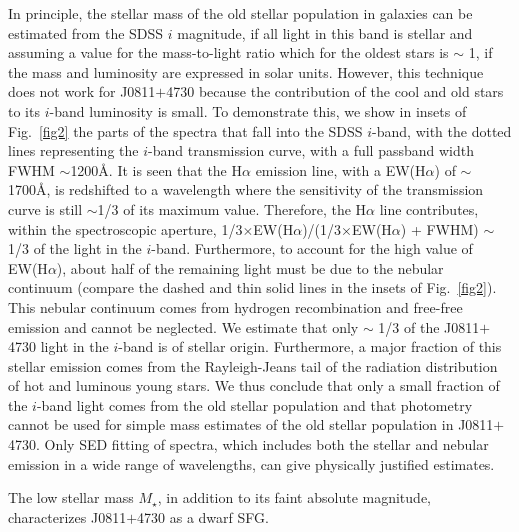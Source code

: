 \documentclass[useAMS,usenatbib]{mn2e}
\begin{document}
In principle, the stellar mass of the old stellar population in galaxies 
can be estimated from the SDSS $i$ magnitude, if all light in this
band is stellar and assuming a value for the  
mass-to-light ratio which for the oldest stars is $\sim$ 1, if the mass and 
luminosity are expressed in solar units. However, this technique does not  
work for J0811$+$4730 because the contribution of the cool and
old stars to its $i$-band luminosity is small. To demonstrate this, we
show in insets of Fig.~\ref{fig2} the parts of the spectra that fall into the SDSS 
$i$-band, with the dotted lines representing the $i$-band transmission curve, with a full passband width FWHM $\sim$1200\AA. 
It is seen that the 
H$\alpha$ emission line, with a EW(H$\alpha$) of $\sim$ 1700\AA, is redshifted to a
wavelength where the sensitivity of the transmission curve is still $\sim$1/3 of 
its maximum value. Therefore, the H$\alpha$ line contributes, within the  
spectroscopic aperture, 1/3$\times$EW(H$\alpha$)/(1/3$\times$EW(H$\alpha$) + 
FWHM) $\sim$ 1/3 of the light in the  $i$-band. 
Furthermore, to account for the high value of EW(H$\alpha$), about half of the
remaining light must be due to the nebular continuum (compare the dashed and 
thin solid lines in the insets of Fig.~\ref{fig2}). This nebular continuum 
comes from hydrogen recombination 
and free-free emission and cannot be 
neglected. We estimate that only $\sim$ 1/3 of the J0811$+$4730 light in the 
$i$-band is of stellar origin. Furthermore, a major fraction of this stellar emission comes from 
the Rayleigh-Jeans tail of the radiation distribution of hot and luminous young stars.
We thus conclude that only a small fraction of the $i$-band light comes from 
the old stellar population and that photometry 
cannot be used for simple mass estimates of the old stellar population in 
J0811$+$4730. 
Only SED fitting of spectra, which includes both the stellar and 
nebular emission in a wide range of wavelengths, can give physically 
justified estimates.

The low stellar mass $M_\star$, in addition to its faint absolute
magnitude, characterizes J0811$+$4730 as a dwarf SFG.
\end{document}
